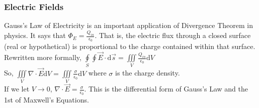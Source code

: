 \subsubsection{Electric Fields}
\noindent
Gauss's Law of Electricity is an important application of Divergence Theorem in physics. It says that $\Phi_{E} = \frac{Q_{in}}{\epsilon_{0}}$. That is, the electric flux through a closed surface (real or hypothetical) is proportional to the charge contained within that surface.\\
Rewritten more formally, $\oint\limits_{S}\oint{\vec{E} \cdot \mathrm{d}\vec{s}} = \iiint\limits_{V}{\frac{Q_{in}}{\epsilon_{0}}\mathrm{d}V}$\\
So, $\iiint\limits_{V}{\nabla\cdot\vec{E}\mathrm{d}V} = \iiint\limits_{V}{\frac{\sigma}{\epsilon_{0}}\mathrm{d}V}$ where $\sigma$ is the charge density.\\
If we let $V \to 0$, $\nabla \cdot \vec{E} = \frac{\sigma}{\epsilon_{0}}$. This is the differential form of Gauss's Law and the 1st of Maxwell's Equations.